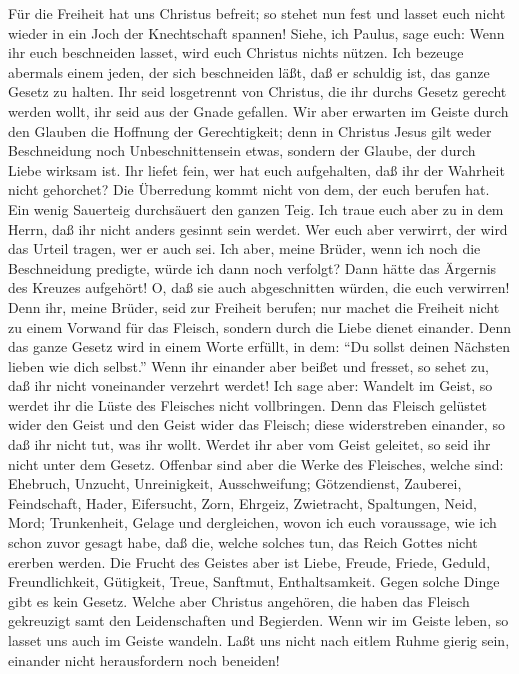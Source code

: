  Für die Freiheit hat uns Christus befreit; so stehet nun
fest und lasset euch nicht wieder in ein Joch der Knechtschaft spannen!
 Siehe, ich Paulus, sage euch: Wenn ihr euch beschneiden
lasset, wird euch Christus nichts nützen.  Ich bezeuge
abermals einem jeden, der sich beschneiden läßt, daß er schuldig ist,
das ganze Gesetz zu halten.  Ihr seid losgetrennt von
Christus, die ihr durchs Gesetz gerecht werden wollt, ihr seid aus der
Gnade gefallen.  Wir aber erwarten im Geiste durch den
Glauben die Hoffnung der Gerechtigkeit;  denn in Christus
Jesus gilt weder Beschneidung noch Unbeschnittensein etwas, sondern der
Glaube, der durch Liebe wirksam ist.  Ihr liefet fein, wer
hat euch aufgehalten, daß ihr der Wahrheit nicht gehorchet?
 Die Überredung kommt nicht von dem, der euch berufen hat.
 Ein wenig Sauerteig durchsäuert den ganzen Teig.
 Ich traue euch aber zu in dem Herrn, daß ihr nicht
anders gesinnt sein werdet. Wer euch aber verwirrt, der wird das Urteil
tragen, wer er auch sei.  Ich aber, meine Brüder, wenn
ich noch die Beschneidung predigte, würde ich dann noch verfolgt? Dann
hätte das Ärgernis des Kreuzes aufgehört!  O, daß sie
auch abgeschnitten würden, die euch verwirren!  Denn ihr,
meine Brüder, seid zur Freiheit berufen; nur machet die Freiheit nicht
zu einem Vorwand für das Fleisch, sondern durch die Liebe dienet
einander.  Denn das ganze Gesetz wird in einem Worte
erfüllt, in dem: ``Du sollst deinen Nächsten lieben wie dich selbst.''
 Wenn ihr einander aber beißet und fresset, so sehet zu,
daß ihr nicht voneinander verzehrt werdet!  Ich sage
aber: Wandelt im Geist, so werdet ihr die Lüste des Fleisches nicht
vollbringen.  Denn das Fleisch gelüstet wider den Geist
und den Geist wider das Fleisch; diese widerstreben einander, so daß ihr
nicht tut, was ihr wollt.  Werdet ihr aber vom Geist
geleitet, so seid ihr nicht unter dem Gesetz.  Offenbar
sind aber die Werke des Fleisches, welche sind: Ehebruch, Unzucht,
Unreinigkeit, Ausschweifung;  Götzendienst, Zauberei,
Feindschaft, Hader, Eifersucht, Zorn, Ehrgeiz, Zwietracht, Spaltungen,
Neid, Mord;  Trunkenheit, Gelage und dergleichen, wovon
ich euch voraussage, wie ich schon zuvor gesagt habe, daß die, welche
solches tun, das Reich Gottes nicht ererben werden.  Die
Frucht des Geistes aber ist Liebe, Freude, Friede, Geduld,
Freundlichkeit, Gütigkeit, Treue, Sanftmut, Enthaltsamkeit.
 Gegen solche Dinge gibt es kein Gesetz. 
Welche aber Christus angehören, die haben das Fleisch gekreuzigt samt
den Leidenschaften und Begierden.  Wenn wir im Geiste
leben, so lasset uns auch im Geiste wandeln.  Laßt uns
nicht nach eitlem Ruhme gierig sein, einander nicht herausfordern noch
beneiden!

